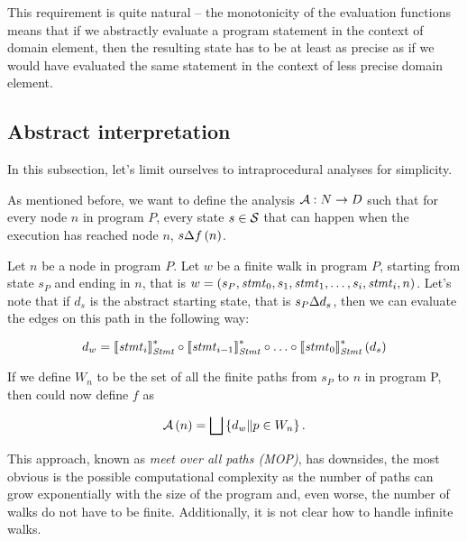 \documentclass[..thesis.tex]{subfiles}
\begin{document}
This requirement is quite natural -- the monotonicity of the evaluation functions means that if we abstractly evaluate a program statement in the context of domain element,
then the resulting state has to be at least as precise as if we would have evaluated the same statement in the context of less precise domain element.  


\subsection{Abstract interpretation}

In this subsection, let's limit ourselves to intraprocedural analyses for simplicity.
 
As mentioned before, we want to define the analysis $\mathcal{A} : N \to D$ such that for every node $n$ in program $P$,
every state $s \in \mathcal{S}$ that can happen when the execution has reached node $n$, $s \Delta f \left( n \right)$.
  
Let $n$ be a node in program $P$. Let $w$ be a finite walk in program $P$,
starting from state $s_P$ and ending in $n$, that is $w = \left( s_P, \mathit{stmt}_0, s_1, \mathit{stmt}_1, \ldots, s_i, \mathit{stmt}_i, n \right)$.
Let's note that if $d_s$ is the abstract starting state, that is $s_P \Delta d_s$, then we can evaluate the edges on this path in the following way:

\begin{equation*}
d_w = \left\llbracket \mathit{stmt}_i \right\rrbracket_{\mathit{Stmt}}^{*} \circ \left\llbracket \mathit{stmt}_{i-1} \right\rrbracket_{\mathit{Stmt}}^{*} \circ \ldots \circ  \left\llbracket \mathit{stmt}_0 \right\rrbracket_{\mathit{Stmt}}^{*} \left( d_s \right)  
\end{equation*}
  
If we define $W_n$ to be the set of all the finite paths from $s_P$ to $n$ in program P, then could now define $f$ as

\begin{equation*}
\mathcal{A} \left( n \right) = \bigsqcup \left\lbrace d_w \| p \in W_n \right\rbrace \text{.} 
\end{equation*}  

This approach, known as \textit{meet over all paths (MOP)}, has downsides,
the most obvious is the possible computational complexity as the number of paths can grow exponentially with the size of the program and, even worse,
the number of walks do not have to be finite. Additionally, it is not clear how to handle infinite walks. 
\end{document}

